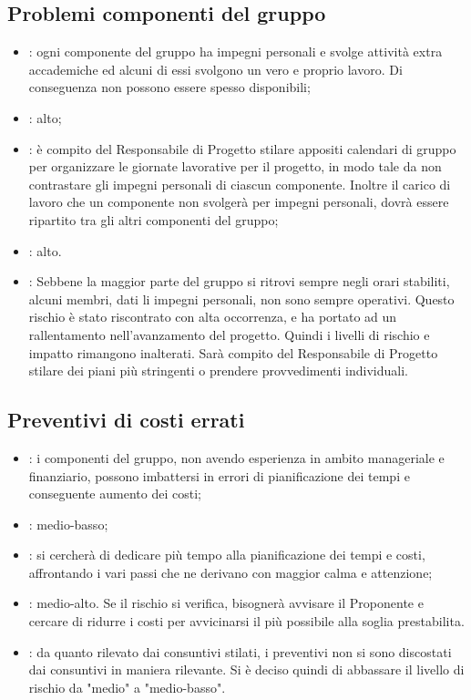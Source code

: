 \subsection{Problemi componenti del gruppo}
\begin{itemize}
\item {}: ogni componente del gruppo ha impegni personali e svolge attività extra accademiche ed alcuni di essi svolgono un vero e proprio lavoro. Di conseguenza non possono essere spesso disponibili;
\item {}: alto;
\item {}: è compito del Responsabile di Progetto stilare appositi calendari di gruppo per organizzare le giornate lavorative per il progetto, in modo tale da non contrastare gli impegni personali di ciascun componente. Inoltre il carico di lavoro che un componente non svolgerà per impegni personali, dovrà essere ripartito tra gli altri componenti del gruppo;
\item {}: alto.
\item {}: Sebbene la maggior parte del gruppo si ritrovi sempre negli orari stabiliti, alcuni membri, dati li impegni personali, non sono sempre operativi. Questo rischio è stato riscontrato con alta occorrenza, e ha portato ad un rallentamento nell'avanzamento del progetto. Quindi i livelli di rischio e impatto rimangono inalterati. Sarà compito del Responsabile di Progetto stilare dei piani più stringenti o prendere provvedimenti individuali.
\end{itemize}

\subsection{Preventivi di costi errati}
\begin{itemize}
\item {}: i componenti del gruppo, non avendo esperienza in ambito manageriale e finanziario, possono imbattersi in errori di pianificazione dei tempi e conseguente aumento dei costi;
\item {}: medio-basso;
\item {}: si cercherà di dedicare più tempo alla pianificazione dei tempi e costi, affrontando i vari passi che ne derivano con maggior calma e attenzione;
\item {}: medio-alto. Se il rischio si verifica, bisognerà avvisare il Proponente e cercare di ridurre i costi per avvicinarsi il più possibile alla soglia prestabilita.
\item {}: da quanto rilevato dai consuntivi stilati, i preventivi non si sono discostati dai consuntivi in maniera rilevante. Si è deciso quindi di abbassare il livello di rischio da "medio" a "medio-basso".
\end{itemize}
